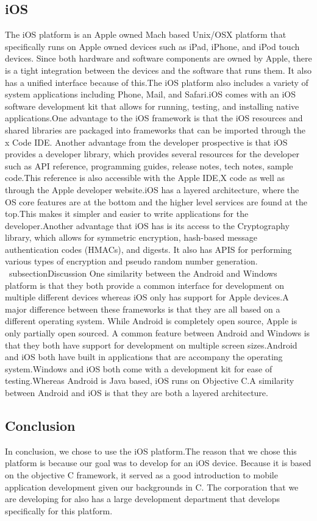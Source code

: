 \documentclass[onecolumn, draftclsnofoot,10pt, compsoc]{IEEEtran}
\begin{document}
        \subsection{iOS}    
        The iOS platform is an Apple owned Mach based Unix/OSX platform that specifically runs on Apple owned devices such as iPad, iPhone, and iPod touch devices. \cite{iOS} Since both hardware and software components are owned by Apple, there is a tight integration between the devices and the software that runs them. It also has a unified interface because of this.The iOS platform also includes a variety of system applications including Phone, Mail, and Safari.iOS comes with an iOS software development kit that allows for running, testing, and installing native applications.One advantage to the iOS framework is that the iOS resources and shared libraries are packaged into frameworks that can be imported through the x Code IDE. Another advantage from the developer prospective is that iOS provides a developer library, which provides several resources for the developer such as API reference, programming guides, release notes, tech notes, sample code.This reference is also accessible with the Apple IDE,X code as well as through the Apple developer website.iOS has a layered architecture, where the OS core features are at the bottom and the higher level services are found at the top.This makes it simpler and easier to write applications for the developer.Another advantage that iOS has is its access to the Cryptography library, which allows for symmetric encryption, hash-based message authentication codes (HMACs), and digests. It also has APIS for performing various types of encryption and pseudo random number generation.\cite{iOS}
   \ subsection{Discussion} 
    One similarity between the Android and Windows platform is that they both provide a common interface for development on multiple different devices whereas iOS only has support for Apple devices.A major difference between these frameworks is that they are all based on a different operating system. While Android is completely open source, Apple is only partially open sourced. A common feature between Android and Windows is that they both have support for development on multiple screen sizes.Android and iOS both have built in applications that are accompany the operating system.Windows and iOS both come with a development kit for ease of testing.Whereas Android is Java based, iOS runs on Objective C.A similarity between Android and iOS is that they are both a layered architecture.
   \subsection{Conclusion}
     In conclusion, we chose to use the iOS platform.The reason that we chose this platform is because our goal was to develop for an iOS device. Because it is based on the objective C framework, it served as a good introduction to mobile application development given our backgrounds in C. The corporation that we are developing for also has a large development department that develops specifically for this platform.
\end{document}
